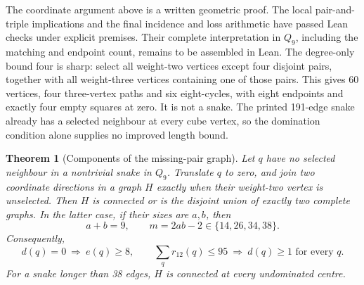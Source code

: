 \documentclass[11pt,a4paper]{article}
\newtheorem{theorem}{Theorem}[section]
\theoremstyle{definition}
\theoremstyle{remark}
\newcommand{\Q}{Q}
\begin{document}
The coordinate argument above is a written geometric proof. The local
pair-and-triple implications and the final incidence and loss arithmetic
have passed Lean checks under explicit premises. Their complete
interpretation in $\Q_9$, including the matching and endpoint count,
remains to be assembled in Lean. The degree-only bound four is sharp:
select all weight-two vertices except four disjoint pairs, together with
all weight-three vertices containing one of those pairs. This gives
60 vertices, four three-vertex paths and six eight-cycles, with eight
endpoints and exactly four empty squares at zero. It is not a snake.
The printed 191-edge snake already has a selected neighbour at every
cube vertex, so the domination condition alone supplies no improved
length bound.

\begin{theorem}[Components of the missing-pair graph]
\label{thm:missing-pair-components}
Let $q$ have no selected neighbour in a nontrivial snake in $\Q_9$.
Translate $q$ to zero, and join two coordinate directions in a graph $H$
exactly when their weight-two vertex is unselected. Then $H$ is connected
or is the disjoint union of exactly two complete graphs.
In the latter case, if their sizes are $a,b$, then
\[
a+b=9,\qquad m=2ab-2\in\{14,26,34,38\}.
\]
Consequently,
\[
\boxed{d(q)=0\ \Longrightarrow\ e(q)\ge8,}
\qquad
\boxed{\sum_q r_{12}(q)\le95\ \Longrightarrow\ d(q)\ge1\text{ for every }q.}
\]
For a snake longer than 38 edges, $H$ is connected at every undominated centre.
\end{theorem}
\end{document}
